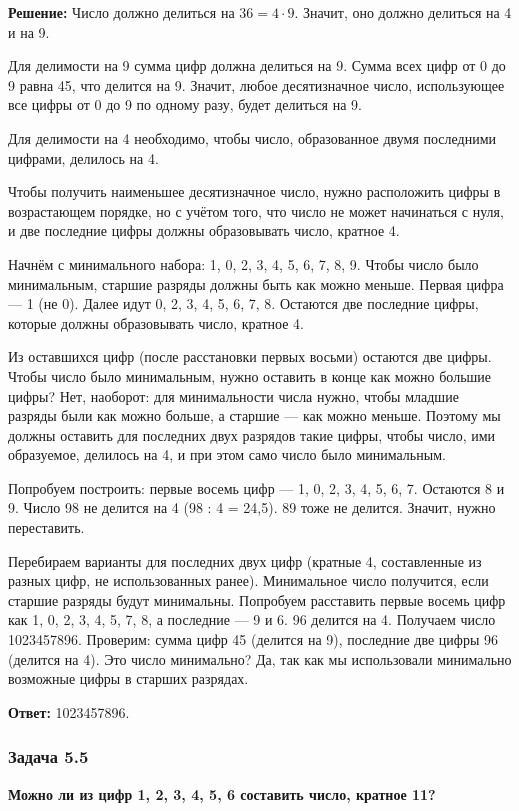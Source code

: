 \documentclass[12pt, a4paper]{article}
\begin{document}
\textbf{Решение:}
Число должно делиться на $36 = 4 \cdot 9$. Значит, оно должно делиться на 4 и на 9.

Для делимости на 9 сумма цифр должна делиться на 9. Сумма всех цифр от 0 до 9 равна 45, что делится на 9. Значит, любое десятизначное число, использующее все цифры от 0 до 9 по одному разу, будет делиться на 9.

Для делимости на 4 необходимо, чтобы число, образованное двумя последними цифрами, делилось на 4.

Чтобы получить наименьшее десятизначное число, нужно расположить цифры в возрастающем порядке, но с учётом того, что число не может начинаться с нуля, и две последние цифры должны образовывать число, кратное 4.

Начнём с минимального набора: 1, 0, 2, 3, 4, 5, 6, 7, 8, 9. Чтобы число было минимальным, старшие разряды должны быть как можно меньше. Первая цифра — 1 (не 0). Далее идут 0, 2, 3, 4, 5, 6, 7, 8. Остаются две последние цифры, которые должны образовывать число, кратное 4.

Из оставшихся цифр (после расстановки первых восьми) остаются две цифры. Чтобы число было минимальным, нужно оставить в конце как можно большие цифры? Нет, наоборот: для минимальности числа нужно, чтобы младшие разряды были как можно больше, а старшие — как можно меньше. Поэтому мы должны оставить для последних двух разрядов такие цифры, чтобы число, ими образуемое, делилось на 4, и при этом само число было минимальным.

Попробуем построить: первые восемь цифр — 1, 0, 2, 3, 4, 5, 6, 7. Остаются 8 и 9. Число 98 не делится на 4 (98 : 4 = 24,5). 89 тоже не делится. Значит, нужно переставить.

Перебираем варианты для последних двух цифр (кратные 4, составленные из разных цифр, не использованных ранее). Минимальное число получится, если старшие разряды будут минимальны. Попробуем расставить первые восемь цифр как 1, 0, 2, 3, 4, 5, 7, 8, а последние — 9 и 6. 96 делится на 4. Получаем число 1023457896. Проверим: сумма цифр 45 (делится на 9), последние две цифры 96 (делится на 4). Это число минимально? Да, так как мы использовали минимально возможные цифры в старших разрядах.

\textbf{Ответ:} 1023457896.

\subsubsection*{Задача 5.5}
\textbf{Можно ли из цифр 1, 2, 3, 4, 5, 6 составить число, кратное 11?}
\end{document}
